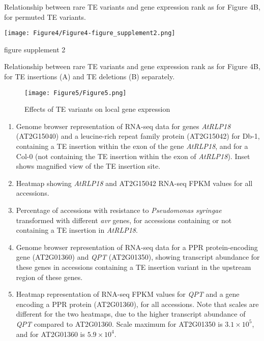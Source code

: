 \documentclass[12pt]{article}
\begin{document}
Relationship between rare TE variants and gene expression rank as for
Figure 4B, for permuted TE variants.

\pagebreak


\setcounter{suppfigure}{3}

\begin{suppfigure}
  \centering
  \texttt{[image: Figure4/Figure4-figure\_supplement2.png]}
  \caption{figure supplement 2}
  \label{fig4s2}
\end{suppfigure}

Relationship between rare TE variants and gene expression rank as for
Figure 4B, for TE insertions (A) and TE deletions (B) separately.

\pagebreak


\begin{figure}[!ht]
  \centering
  \texttt{[image: Figure5/Figure5.png]}
  \caption{Effects of TE variants on local gene expression}
  \label{fig5}
\end{figure}

\begin{enumerate}
\def\labelenumi{(\Alph{enumi})}
\item
  Genome browser representation of RNA-seq data for genes \emph{AtRLP18}
  (AT2G15040) and a leucine-rich repeat family protein (AT2G15042) for
  Db-1, containing a TE insertion within the exon of the gene
  \emph{AtRLP18}, and for a Col-0 (not containing the TE insertion
  within the exon of \emph{AtRLP18}). Inset shows magnified view of the
  TE insertion site.
\item
  Heatmap showing \emph{AtRLP18 }and AT2G15042 RNA-seq FPKM values for
  all accessions.
\item
  Percentage of accessions with resistance to \emph{Pseudomonas syringae
  }transformed with different \emph{avr }genes, for accessions
  containing or not containing a TE insertion in \emph{AtRLP18}.
\item
  Genome browser representation of RNA-seq data for a PPR
  protein-encoding gene (AT2G01360) and \emph{QPT }(AT2G01350), showing
  transcript abundance for these genes in accessions containing a TE
  insertion variant in the upstream region of these genes.
\item
  Heatmap representation of RNA-seq FPKM values for \emph{QPT }and a
  gene encoding a PPR protein (AT2G01360), for all accessions. Note that
  scales are different for the two heatmaps, due to the higher
  transcript abundance of \emph{QPT} compared to AT2G01360. Scale
  maximum for AT2G01350 is $3.1\times10^5$, and for AT2G01360 is $5.9\times10^4$.
\end{enumerate}
\end{document}
